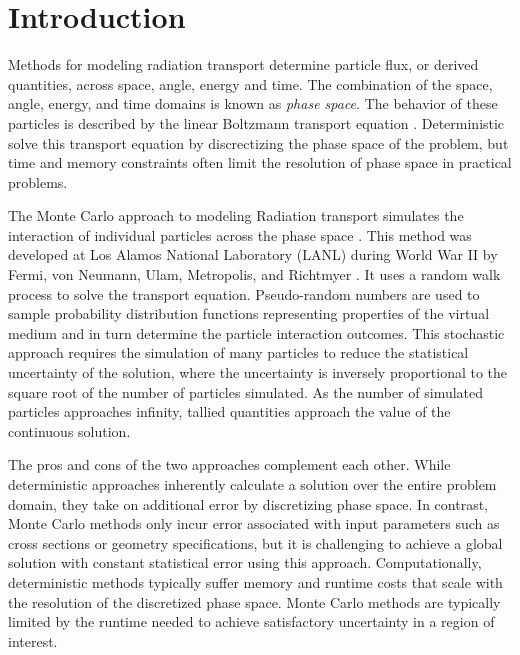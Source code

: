 \newcommand{\dagmcModel}[2] {
  \null %
  \textbf{\uppercase{#1}} 
  \begin{adjustwidth}{2.5em}{0pt}
    #2
  \end{adjustwidth}
  \null
}

\chapter{Introduction}\label{ch:introduction}

Methods for modeling radiation transport determine particle flux, or derived
quantities, across space, angle, energy and time. The combination of the space,
angle, energy, and time domains is known as \textit{phase space}. The behavior
of these particles is described by the linear Boltzmann transport
equation \cite{Ulam_1949}. Deterministic solve this transport equation by discrectizing
the phase space of the problem, but time and memory constraints often limit the
resolution of phase space in practical problems.

The Monte Carlo approach to modeling Radiation transport simulates the
interaction of individual particles across the phase
space \cite{Lewis_1993}. This method was developed at Los Alamos National
Laboratory (LANL) during World War II by Fermi, von Neumann, Ulam, Metropolis,
and Richtmyer \cite{LANL_1987}. It uses a random walk process to solve the
transport equation. Pseudo-random numbers are used to sample probability
distribution functions representing properties of the virtual medium and in turn
determine the particle interaction outcomes. This stochastic approach requires
the simulation of many particles to reduce the statistical uncertainty of the
solution, where the uncertainty is inversely proportional to the square root of
the number of particles simulated. As the number of simulated particles
approaches infinity, tallied quantities approach the value of the continuous
solution.

The pros and cons of the two approaches complement each other. While
deterministic approaches inherently calculate a solution over the entire problem
domain, they take on additional error by discretizing phase space. In contrast,
Monte Carlo methods only incur error associated with input parameters such as
cross sections or geometry specifications, but it is challenging to achieve a
global solution with constant statistical error using this
approach. Computationally, deterministic methods typically suffer memory and
runtime costs that scale with the resolution of the discretized phase
space. Monte Carlo methods are typically limited by the runtime needed to
achieve satisfactory uncertainty in a region of interest.


